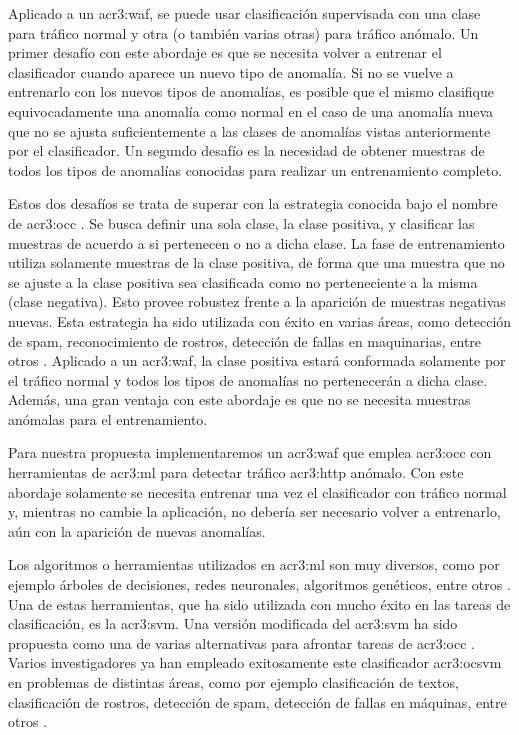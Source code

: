 Aplicado a un \gls{acr3:waf}, se puede usar clasificación supervisada
con una clase para tráfico normal y otra (o también varias otras) para
tráfico anómalo.
Un primer desafío con este abordaje es que se necesita volver a entrenar
el clasificador cuando aparece un nuevo tipo de anomalía. Si no se
vuelve a entrenarlo con los nuevos tipos de anomalías, es posible que
el mismo clasifique equivocadamente una anomalía como normal en el caso
de una anomalía nueva que no se ajusta suficientemente a las clases de
anomalías vistas anteriormente por el clasificador.
Un segundo desafío es la necesidad de obtener muestras de todos los tipos
de anomalías conocidas para realizar un entrenamiento completo.

Estos dos desafíos se trata de superar con la estrategia conocida bajo el
nombre de \gls{acr3:occ} \cite{khan2009survey}. Se busca definir una sola
clase, la clase positiva, y clasificar las muestras de acuerdo a si
pertenecen o no a dicha clase. La fase de entrenamiento utiliza solamente
muestras de la clase positiva, de forma que una muestra que no se ajuste
a la clase positiva sea clasificada como no perteneciente a la misma
(clase negativa). Esto provee robustez frente a la aparición de muestras
negativas nuevas.
Esta estrategia ha sido utilizada con éxito en varias áreas, como detección
de spam, reconocimiento de rostros, detección de fallas en maquinarias, entre
otros \cite{khan2009survey}.
Aplicado a un \gls{acr3:waf}, la clase positiva estará conformada solamente
por el tráfico normal y todos los tipos de anomalías no pertenecerán a dicha
clase. Además, una gran ventaja con este abordaje es que no se necesita
muestras anómalas para el entrenamiento.

Para nuestra propuesta implementaremos un \gls{acr3:waf} que emplea
\gls{acr3:occ} con herramientas de \gls{acr3:ml} para detectar tráfico
\gls{acr3:http} anómalo. Con este abordaje solamente se necesita entrenar
una vez el clasificador con tráfico normal y, mientras no cambie la
aplicación, no debería ser necesario volver a entrenarlo, aún con
la aparición de nuevas anomalías.
\bigskip

Los algoritmos o herramientas utilizados en \gls{acr3:ml} son muy diversos,
como por ejemplo árboles de decisiones, redes neuronales, algoritmos
genéticos, entre otros \cite{torranoGimenez2015study}. Una de estas
herramientas, que ha sido utilizada con mucho éxito en las tareas de
clasificación, es la \gls{acr3:svm}. Una versión modificada del \gls{acr3:svm}
ha sido propuesta como una de varias alternativas para afrontar tareas de
\gls{acr3:occ} \cite{scholkopf2001estimating}.
Varios investigadores ya han empleado exitosamente este clasificador
\gls{acr3:ocsvm} en problemas de distintas áreas, como por ejemplo
clasificación de textos, clasificación de rostros, detección de spam,
detección de fallas en máquinas, entre otros \cite{khan2009survey}.

